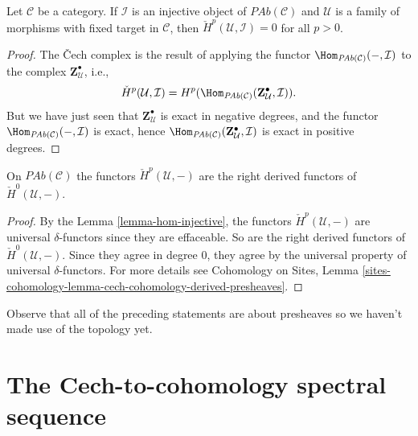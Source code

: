\begin{lemma}
\label{lemma-hom-injective}
Let $\mathcal{C}$ be a category. If $\mathcal{I}$ is an injective object of
$\textit{PAb}(\mathcal{C})$ and $\mathcal{U}$ is a family of morphisms with
fixed target in $\mathcal{C}$, then $\check H^p(\mathcal{U}, \mathcal{I}) = 0$
for all $p>0$.
\end{lemma}

\begin{proof}
The {\v C}ech complex is the result of applying the functor
$\Hom_{\textit{PAb}(\mathcal{C})}(-, \mathcal{I}) $ to the complex $
\mathbf{Z}^\bullet_\mathcal{U} $, i.e.,
$$
\check H^p(\mathcal{U}, \mathcal{I}) = H^p
(\Hom_{\textit{PAb}(\mathcal{C})} (\mathbf{Z}^\bullet_\mathcal{U},
\mathcal{I})).
$$
But we have just seen that $\mathbf{Z}^\bullet_\mathcal{U}$ is exact in
negative degrees, and the functor $\Hom_{\textit{PAb}(\mathcal{C})}(-,
\mathcal{I})$ is exact, hence $\Hom_{\textit{PAb}(\mathcal{C})}
(\mathbf{Z}^\bullet_\mathcal{U}, \mathcal{I})$ is exact in positive degrees.
\end{proof}

\begin{theorem}
\label{theorem-cech-derived}
On $\textit{PAb}(\mathcal{C})$ the functors $\check{H}^p(\mathcal{U}, -)$ are
the right derived functors of $\check{H}^0(\mathcal{U}, -)$.
\end{theorem}

\begin{proof}
By the Lemma \ref{lemma-hom-injective}, the functors
$\check H^p(\mathcal{U}, -)$ are universal
$\delta$-functors since they are effaceable.
So are the right derived functors of $\check H^0(\mathcal{U}, -)$. Since they
agree in degree $0$, they agree by the universal property of universal
$\delta$-functors. For more details see
Cohomology on Sites,
Lemma \ref{sites-cohomology-lemma-cech-cohomology-derived-presheaves}.
\end{proof}

\begin{remark}
\label{remark-presheaves-no-topology}
Observe that all of the preceding statements are about presheaves so we haven't
made use of the topology yet.
\end{remark}




\section{The Cech-to-cohomology spectral sequence}
\label{section-cech-ss}

